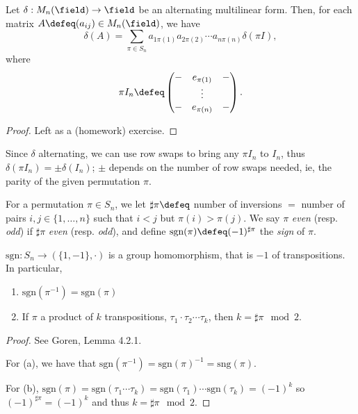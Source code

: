 \begin{proposition}\label{prop:alternatingmultilinearpermutations}
    Let $\delta : M_n{(\field)} \to \field$ be an alternating multilinear form. Then, for each matrix $A \defeq (a_{ij}) \in M_n(\field)$, we have \[
    \delta(A)     = \sum_{ \pi \in S_n}a_{1 \pi(1)}a_{2 \pi(2)}\cdots a_{n\pi(n)} \delta(\pi I),
    \]
    where \[
    \pi I_n \defeq \begin{pmatrix}
        - & e_{\pi(1)} & -\\
        & \vdots & \\
        - & e_{\pi(n)} & -
    \end{pmatrix}.
    \]
\end{proposition}
\begin{proof}
    Left as a (homework) exercise.
\end{proof}
\begin{remark}
    Since $\delta$ alternating, we can use row swaps to bring any $\pi I_n$ to $I_n$, thus $\delta(\pi I_n) = \pm \delta(I_n)$; $\pm$ depends on the number of row swaps needed, ie, the parity of the given permutation $\pi$.
\end{remark}

\begin{definition}[Parity]
    For a permutation $\pi \in S_n$, we let $\sharp \pi \defeq $ number of inversions $ = $ number of pairs $i, j\in \{1, \dots, n\}$ such that $i < j$ but $\pi(i) > \pi(j)$. We say $\pi$ \emph{even} (resp. \emph{odd}) if $\sharp\pi$ \emph{even} (resp. \emph{odd}), and define $\text{sgn}(\pi) \defeq (-1)^{\sharp \pi}$ the \emph{sign} of $\pi$.
\end{definition}

\begin{proposition}
    $\text{sgn} : S_n \to (\{1, -1\}, \cdot)$ is a group homomorphism, that is $-1$ of transpositions. In particular, \begin{enumerate}
        \item $\text{sgn}(\pi^{-1}) = \text{sgn}(\pi)$
        \item If $\pi$ a product of $k$ transpositions, $\tau_1 \cdot \tau_2 \cdots \tau_k$, then $k = \sharp \pi \mod 2$.
    \end{enumerate}
\end{proposition}

\begin{proof}
    See Goren, Lemma 4.2.1. 
    
    For (a), we have that $\text{sgn}(\pi^{-1}) = \text{sgn}(\pi)^{-1} = \text{sng}(\pi)$.

    For (b), $\text{sgn}(\pi) = \text{sgn}(\tau_1 \cdots \tau_k) = \text{sgn}(\tau_1) \cdots \text{sgn}(\tau_k) = (-1)^k$ so $(-1)^{\sharp \pi} = (-1)^k$ and thus $k = \sharp \pi \mod 2$.
\end{proof}

